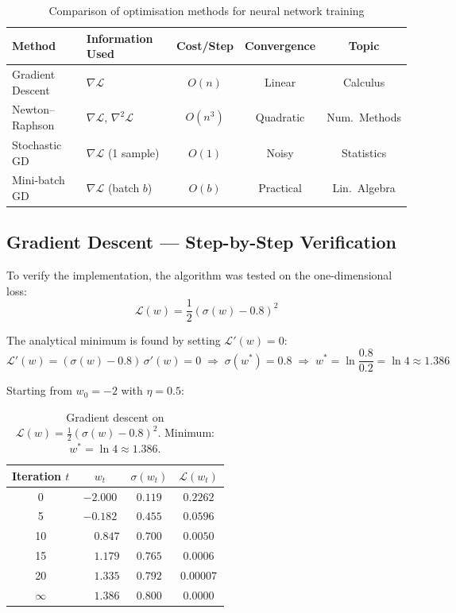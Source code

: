 \documentclass[12pt,a4paper]{article}
\begin{document}
\begin{table}[H]
  \centering
  \caption{Comparison of optimisation methods for neural network training}
  \renewcommand{\arraystretch}{1.3}
  \begin{tabular}{lp{3.2cm}ccc}
    \toprule
    \textbf{Method} & \textbf{Information Used} & \textbf{Cost/Step} & \textbf{Convergence} & \textbf{Topic}\\
    \midrule
    Gradient Descent  & $\nabla\mathcal{L}$                        & $O(n)$   & Linear    & Calculus \\
    Newton--Raphson   & $\nabla\mathcal{L}$, $\nabla^2\mathcal{L}$ & $O(n^3)$ & Quadratic & Num.\ Methods \\
    Stochastic GD     & $\nabla\mathcal{L}$ (1 sample)             & $O(1)$   & Noisy     & Statistics \\
    Mini-batch GD     & $\nabla\mathcal{L}$ (batch $b$)            & $O(b)$   & Practical & Lin.\ Algebra \\
    \bottomrule
  \end{tabular}
  \label{tab:methods}
\end{table}

\subsection{Gradient Descent --- Step-by-Step Verification}

To verify the implementation, the algorithm was tested on the one-dimensional loss:
\[
  \mathcal{L}(w) = \frac{1}{2}(\sigma(w) - 0.8)^2
\]

The analytical minimum is found by setting $\mathcal{L}'(w) = 0$:
\[
  \mathcal{L}'(w) = (\sigma(w) - 0.8)\,\sigma'(w) = 0
  \;\Rightarrow\; \sigma(w^*) = 0.8
  \;\Rightarrow\; w^* = \ln\frac{0.8}{0.2} = \ln 4 \approx 1.386
\]

Starting from $w_0 = -2$ with $\eta = 0.5$:

\begin{table}[H]
  \centering
  \caption{Gradient descent on $\mathcal{L}(w) = \frac{1}{2}(\sigma(w)-0.8)^2$. Minimum: $w^* = \ln 4 \approx 1.386$.}
  \renewcommand{\arraystretch}{1.3}
  \begin{tabular}{cccc}
    \toprule
    \textbf{Iteration} $t$ & $w_t$ & $\sigma(w_t)$ & $\mathcal{L}(w_t)$ \\
    \midrule
    0  & $-2.000$ & $0.119$ & $0.2262$ \\
    5  & $-0.182$ & $0.455$ & $0.0596$ \\
    10 & $\phantom{-}0.847$ & $0.700$ & $0.0050$ \\
    15 & $\phantom{-}1.179$ & $0.765$ & $0.0006$ \\
    20 & $\phantom{-}1.335$ & $0.792$ & $0.00007$\\
    $\infty$ & $\phantom{-}1.386$ & $0.800$ & $0.0000$ \\
    \bottomrule
  \end{tabular}
  \label{tab:gd}
\end{table}
\end{document}
